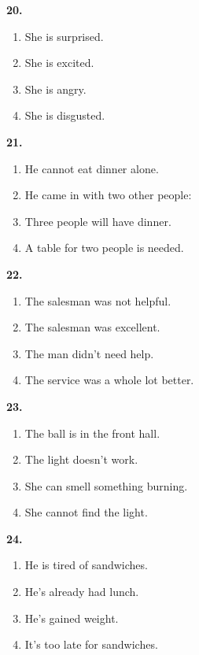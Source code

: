\documentclass[12pt]{article}
\begin{document}
\par
\vspace{0.25\baselineskip}
\noindent\textbf{20.}
\begin{enumerate}[label=(\Alph*),leftmargin=*,itemsep=0.2em]
\item She is surprised.
\item She is excited.
\item She is angry.
\item She is disgusted.
\end{enumerate}
\par
\vspace{0.25\baselineskip}
\noindent\textbf{21.}
\begin{enumerate}[label=(\Alph*),leftmargin=*,itemsep=0.2em]
\item He cannot eat dinner alone.
\item He came in with two other people:
\item Three people will have dinner.
\item A table for two people is needed.
\end{enumerate}
\par
\vspace{0.25\baselineskip}
\noindent\textbf{22.}
\begin{enumerate}[label=(\Alph*),leftmargin=*,itemsep=0.2em]
\item The salesman was not helpful.
\item The salesman was excellent.
\item The man didn't need help.
\item The service was a whole lot better.
\end{enumerate}
\par
\vspace{0.25\baselineskip}
\noindent\textbf{23.}
\begin{enumerate}[label=(\Alph*),leftmargin=*,itemsep=0.2em]
\item The ball is in the front hall.
\item The light doesn't work.
\item She can smell something burning.
\item She cannot find the light.
\end{enumerate}
\par
\vspace{0.25\baselineskip}
\noindent\textbf{24.}
\begin{enumerate}[label=(\Alph*),leftmargin=*,itemsep=0.2em]
\item He is tired of sandwiches.
\item He's already had lunch.
\item He's gained weight.
\item It's too late for sandwiches.
\end{enumerate}
\end{document}
